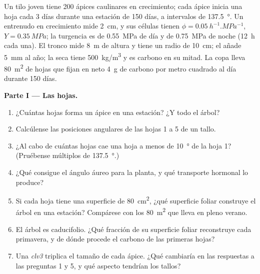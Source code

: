 \begin{problem}
\label{pb:b2:plant-meristems:1}
Un tilo joven tiene \num{200} ápices caulinares en crecimiento; cada ápice
inicia una hoja cada \num{3} días durante una estación de \num{150} días, a
intervalos de \qty{137.5}{\degree}. Un entrenudo en crecimiento mide
\qty{2}{cm}, y sus células tienen $\phi = \qty{0.05}{h^{-1}.MPa^{-1}}$, $Y =
\qty{0.35}{MPa}$; la turgencia es de \qty{0.55}{MPa} de día y de
\qty{0.75}{MPa} de noche (\qty{12}{h} cada una). El tronco mide
\qty{8}{m} de altura y tiene un radio de \qty{10}{cm}; el  añade
\qty{5}{mm} al año; la  seca tiene \qty{500}{kg/m^3} y es carbono en
su mitad. La copa lleva \qty{80}{m^2} de hojas que fijan en neto \qty{4}{g}
de carbono por metro cuadrado al día durante \num{150} días.

\medskip
\noindent\textbf{Parte I --- Las hojas.}
\begin{enumerate}
  \item ¿Cuántas hojas forma un ápice en una estación? ¿Y todo el árbol?
  \item Calcúlense las posiciones angulares de las hojas 1 a 5 de un tallo.
  \item ¿Al cabo de cuántas hojas cae una hoja a menos de
        \qty{10}{\degree} de la hoja 1? (Pruébense múltiplos de
        \qty{137.5}{\degree}.)
  \item ¿Qué consigue el ángulo áureo para la planta, y qué transporte
        hormonal lo produce?
  \item Si cada hoja tiene una superficie de \qty{80}{cm^2}, ¿qué superficie
        foliar construye el árbol en una estación? Compárese con los
        \qty{80}{m^2} que lleva en pleno verano.
  \item El árbol es caducifolio. ¿Qué fracción de su superficie foliar
        reconstruye cada primavera, y de dónde procede el carbono de las
        primeras hojas?
  \item Una  \emph{clv3} triplica el tamaño de cada ápice. ¿Qué
        cambiaría en las respuestas a las preguntas 1 y 5, y qué aspecto
        tendrían los tallos?
\end{enumerate}


\end{problem}
